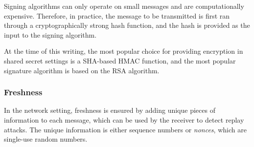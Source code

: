 Signing algorithms can only operate on small messages and are computationally
expensive. Therefore, in practice, the message to be transmitted is first ran
through a cryptographically strong hash function, and the hash is provided as
the input to the signing algorithm.

At the time of this writing, the most popular choice for providing encryption
in shared secret settings is a SHA-based HMAC function, and the most popular
signature algorithm is based on the RSA algorithm.


\subsubsection{Freshness}

In the network setting, freshness is ensured by adding unique pieces of
information to each message, which can be used by the receiver to detect replay
attacks. The unique information is either sequence numbers or \textit{nonces},
which are single-use random numbers.
